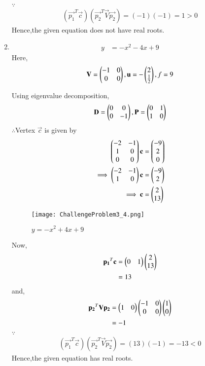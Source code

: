 \documentclass[journal,12pt,twocolumn]{IEEEtran}
\begin{document}
\begin{enumerate}
    $\because$
    \begin{align}
    (\vec{p_1}^T\vec{c})(\vec{p_2}^T\vec{V}\vec{p_2}) = (-1)(-1) = 1>0
    \end{align}
    Hence,the given equation does not have real roots.
  
    \item
    \begin{align}
        y &= -x^2-4x+9
    \end{align}
    Here,
    \begin{align}
        \mathbf{V} = \begin{pmatrix}-1 & 0 \\ 0 & 0\end{pmatrix},\mathbf{u}=-\begin{pmatrix}2 \\ \frac{1}{2}\end{pmatrix},f=9
    \end{align}
  
    Using eigenvalue decomposition,
    \begin{align}
        \mathbf{D} = \begin{pmatrix}0 & 0\\0 & -1\end{pmatrix} ,\mathbf{P}=\begin{pmatrix}0 & 1\\1 & 0\end{pmatrix}
    \end{align}
    $\therefore$Vertex $\vec{c}$ is given by
    \begin{align}
        \begin{pmatrix}-2 & -1 \\ 1 & 0 \\ 0 & 0\end{pmatrix}\mathbf{c} &= \begin{pmatrix}-9 \\ 2 \\ 0\end{pmatrix} \\
        \implies  \begin{pmatrix}-2 & -1 \\ 1 & 0\end{pmatrix}\mathbf{c} &= \begin{pmatrix}-9 \\ 2\end{pmatrix}
        \\
        \implies \mathbf{c} &= \begin{pmatrix}2\\13\end{pmatrix}
    \end{align}
    
    \begin{figure}[!ht]
    \centering
    \texttt{[image: ChallengeProblem3\_4.png]}
    \caption{$y=-x^2+4x+9$}
    \label{ex3}	
    \end{figure}
    
    Now,
    \begin{align}
        \mathbf{p_1}^T\mathbf{c} &= \begin{pmatrix}0 & 1\end{pmatrix}\begin{pmatrix}2 \\ 13\end{pmatrix}
        \\
        &= 13
    \end{align}
    and,
    \begin{align}
        \mathbf{p_2}^T\mathbf{V}\mathbf{p_2} &= \begin{pmatrix}1 & 0\end{pmatrix}\begin{pmatrix}-1 & 0\\0& 0\end{pmatrix}\begin{pmatrix}1 \\ 0\end{pmatrix}
        \\
        &= -1
    \end{align}
    $\because$
    \begin{align}
    (\vec{p_1}^T\vec{c})(\vec{p_2}^T\vec{V}\vec{p_2}) = (13)(-1) = -13<0
    \end{align}
    Hence,the given equation has real roots.
\end{enumerate}
\end{document}
